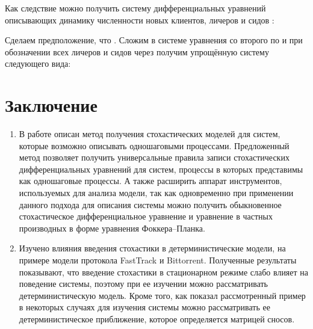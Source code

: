 \documentclass[floatfix,
showkeys,
twocolumn, nofootinbib, superscriptaddress, ]{revtex4-1}
\begin{document}
Как следствие можно получить систему дифференциальных уравнений
описывающих динамику численности новых клиентов, личеров и сидов :





Сделаем предположение, что
. Сложим в
системе уравнения со второго по  и при обозначении всех личеров и
сидов через  получим упрощённую
систему следующего вида:




\section{Заключение}

\begin{enumerate}
\item В работе описан метод получения стохастических моделей для
  систем, которые возможно описывать одношаговыми
  процессами. Предложенный метод позволяет получить универсальные
  правила записи стохастических дифференциальных уравнений для систем,
  процессы в которых представимы как одношаговые процессы. А также
  расширить аппарат инструментов, используемых для анализа модели, так
  как одновременно при применении данного подхода для описания системы
  можно получить обыкновенное стохастическое дифференциальное
  уравнение и уравнение в частных производных в форме уравнения
  Фоккера--Планка.
\item Изучено влияния введения стохастики в детерминистические модели,
  на примере модели протокола FastTrack и Bittorrent. Полученные
  результаты показывают, что введение стохастики в стационарном режиме
  слабо влияет на поведение системы, поэтому при ее изучении можно
  рассматривать детерминистическую модель. Кроме того, как показал
  рассмотренный пример в некоторых случаях для изучения системы можно
  рассматривать ее детерминистическое приближение, которое
  определяется матрицей сносов.
\end{enumerate}





\end{document}
